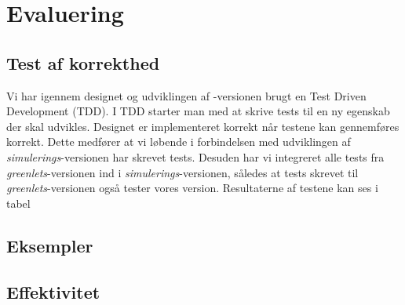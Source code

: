 \section{Evaluering}
\subsection{Test af korrekthed}
  Vi har igennem designet og udviklingen af -versionen brugt en Test Driven Development (TDD). I TDD starter man med at skrive tests til en ny egenskab der skal udvikles. Designet er implementeret korrekt når testene kan gennemføres korrekt. Dette medfører at vi løbende i forbindelsen med udviklingen af \emph{simulerings}-versionen har skrevet tests. Desuden har vi integreret alle tests fra \emph{greenlets}-versionen ind i \emph{simulerings}-versionen, således at tests skrevet til \emph{greenlets}-versionen også tester vores version. Resultaterne af testene kan ses i tabel 
  
\subsection{Eksempler}



\subsection{Effektivitet}  
  


